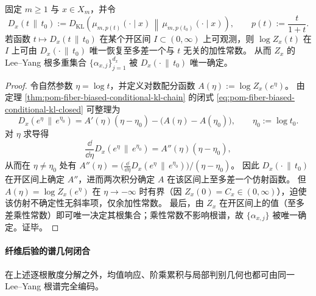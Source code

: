 \begin{proposition}\label{prop:pom-fiber-leyang-roots-identifiable-from-kl-curve}
固定 \(m\ge 1\) 与 \(x\in X_m\)，并令
\[
D_x(t\,\|\,t_0):=D_{\mathrm{KL}}\!\left(\mu_{m,p(t)}(\cdot\mid x)\,\middle\|\,\mu_{m,p(t_0)}(\cdot\mid x)\right),
\qquad
p(t):=\frac{t}{1+t}.
\]
若函数 \(t\mapsto D_x(t\,\|\,t_0)\) 在某个开区间 \(I\subset(0,\infty)\) 上可观测，则 \(\log Z_x(t)\) 在 \(I\) 上可由 \(D_x(\cdot\,\|\,t_0)\) 唯一恢复至多差一个与 \(t\) 无关的加性常数。
从而 \(Z_x\) 的 Lee--Yang 根多重集合 \(\{\alpha_{x,j}\}_{j=1}^{d_x}\) 被 \(D_x(\cdot\,\|\,t_0)\) 唯一确定。
\end{proposition}
\begin{proof}
令自然参数 \(\eta=\log t\)，并定义对数配分函数 \(A(\eta):=\log Z_x(e^\eta)\)。
由定理 \ref{thm:pom-fiber-biased-conditional-kl-chain} 的闭式 \eqref{eq:pom-fiber-biased-conditional-kl-closed} 可整理为
\[
D_x(e^\eta\,\|\,e^{\eta_0})
=A'(\eta)(\eta-\eta_0)-\bigl(A(\eta)-A(\eta_0)\bigr),
\qquad \eta_0:=\log t_0.
\]
对 \(\eta\) 求导得
\[
\frac{\dd}{\dd\eta}D_x(e^\eta\,\|\,e^{\eta_0})
=A''(\eta)(\eta-\eta_0),
\]
从而在 \(\eta\neq\eta_0\) 处有
\(
A''(\eta)=\bigl(\frac{\dd}{\dd\eta}D_x(e^\eta\,\|\,e^{\eta_0})\bigr)/(\eta-\eta_0)
\)。
因此 \(D_x(\cdot\,\|\,t_0)\) 在开区间上确定 \(A''\)，进而两次积分确定 \(A\) 在该区间上至多差一个仿射函数。
但 \(A(\eta)=\log Z_x(e^\eta)\) 在 \(\eta\to-\infty\) 时有界（因 \(Z_x(0)=C_x\in(0,\infty)\)），迫使该仿射不确定性无斜率项，仅余加性常数。
最后，由 \(Z_x\) 在开区间上的值（至多差乘性常数）即可唯一决定其根集合；乘性常数不影响根谱，故 \(\{\alpha_{x,j}\}\) 被唯一确定。证毕。
\end{proof}

\paragraph{纤维后验的谱几何闭合}
在上述逐根散度分解之外，均值响应、阶乘累积与局部判别几何也都可由同一 Lee--Yang 根谱完全编码。

